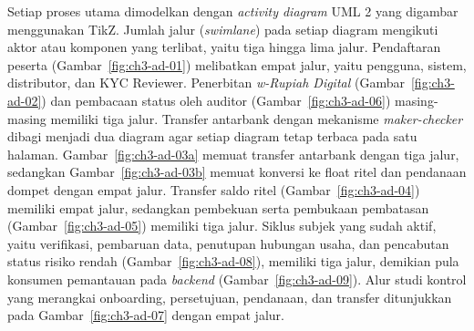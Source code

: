 Setiap proses utama dimodelkan dengan \textit{activity diagram} UML 2 yang digambar menggunakan TikZ. Jumlah jalur (\textit{swimlane}) pada setiap diagram mengikuti aktor atau komponen yang terlibat, yaitu tiga hingga lima jalur. Pendaftaran peserta (Gambar~\ref{fig:ch3-ad-01}) melibatkan empat jalur, yaitu pengguna, sistem, distributor, dan KYC Reviewer. Penerbitan \textit{w-Rupiah Digital} (Gambar~\ref{fig:ch3-ad-02}) dan pembacaan status oleh auditor (Gambar~\ref{fig:ch3-ad-06}) masing-masing memiliki tiga jalur. Transfer antarbank dengan mekanisme \textit{maker-checker} dibagi menjadi dua diagram agar setiap diagram tetap terbaca pada satu halaman. Gambar~\ref{fig:ch3-ad-03a} memuat transfer antarbank dengan tiga jalur, sedangkan Gambar~\ref{fig:ch3-ad-03b} memuat konversi ke float ritel dan pendanaan dompet dengan empat jalur. Transfer saldo ritel (Gambar~\ref{fig:ch3-ad-04}) memiliki empat jalur, sedangkan pembekuan serta pembukaan pembatasan (Gambar~\ref{fig:ch3-ad-05}) memiliki tiga jalur. Siklus subjek yang sudah aktif, yaitu verifikasi, pembaruan data, penutupan hubungan usaha, dan pencabutan status risiko rendah (Gambar~\ref{fig:ch3-ad-08}), memiliki tiga jalur, demikian pula konsumen pemantauan pada \textit{backend} (Gambar~\ref{fig:ch3-ad-09}). Alur studi kontrol yang merangkai onboarding, persetujuan, pendanaan, dan transfer ditunjukkan pada Gambar~\ref{fig:ch3-ad-07} dengan empat jalur.



